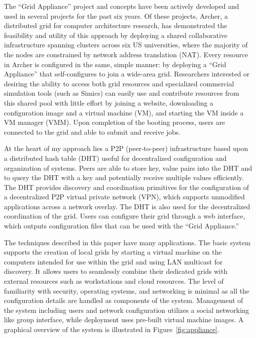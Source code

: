 The ``Grid Appliance'' project and concepts have been actively developed and
used in several projects for the past six years.  Of these projects, Archer, a
distributed grid for computer architecture research,
has demonstrated the feasibility and utility of this approach by
deploying a shared collaborative infrastructure spanning clusters across six US
universities, where the majority of the nodes are constrained by network
address translation (NAT).  Every resource in Archer is configured in the same,
simple manner:  by deploying a ``Grid Appliance'' that self-configures to join a
wide-area grid.  Researchers interested or desiring the ability to access both
grid resources and specialized commercial simulation tools (such as Simics) can
easily use and contribute resources from this shared pool with little effort
by joining a website, downloading a configuration image and a virtual
machine (VM), and starting the VM inside a VM manager (VMM).  Upon completion of
the booting process, users are connected to the grid and able to submit and
receive jobs.

At the heart of my approach lies a P2P (peer-to-peer) infrastructure based upon
a distributed hash table (DHT) useful for decentralized configuration and
organization of systems.  Peers are able to store key, value pairs into the DHT
and to query the DHT with a key and potentially receive multiple values
efficiently.  The DHT provides discovery and coordination primitives for the
configuration of a decentralized P2P virtual private network (VPN), which
supports unmodified applications across a network overlay.  The DHT is also
used for the decentralized coordination of the grid.  Users can configure their
grid through a web interface, which outputs configuration files that can be
used with the ``Grid Appliance.''

The techniques described in this paper have many applications.  The basic
system supports the creation of local grids by starting a virtual machine on
the computers intended for use within the grid and using LAN multicast for
discovery.  It allows users to seamlessly combine their dedicated grids with
external resources such as workstations and cloud resources.  The level of
familiarity with security, operating systems, and networking is minimal as all
the configuration details are handled as components of the system.  Management
of the system including users and network configuration utilizes a social
networking like group interface, while deployment uses pre-built virtual
machine images.  A graphical overview of the system is illustrated in
Figure~\ref{fig:appliance}.

